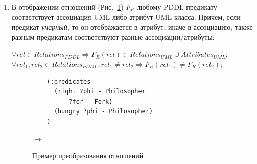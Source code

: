 \documentclass[a4paper,14pt]{extreport}
\begin{document}
\begin{enumerate}
        \item В отображении отношений (Рис.~\ref{img:property-relations}) $F_R$ любому PDDL-предикату соответствует ассоциация UML либо атрибут UML-класса. Причем, если предикат \textit{унарный}, то он отображается в атрибут, иначе в ассоциацию; также разным предикатам соответствуют разные ассоциации/атрибуты:
    
        \begin{center}
        $\forall rel \in Relations_{PDDL} \Rightarrow F_R(rel) \in Relations_{UML} \cup Attributes_{UML}$;\\
        $\forall rel_1, rel_2 \in Relations_{PDDL}, rel_1 \neq rel_2 \Rightarrow F_R(rel_1) \neq F_R(rel_2)$; \\
        \end{center}

    
\begin{figure}[h]
    \hfill
    \begin{minipage}[h]{0.50\linewidth}
        {\raggedright
        \begin{verbatim}
    (:predicates
      (right ?phi - Philosopher 
          ?for - Fork)
      (hungry ?phi - Philosopher)
    )
        \end{verbatim} 
        }
    \end{minipage}
    \hfill
    $\rightarrow$
    \hfill
    \begin{minipage}[h]{0.45\linewidth}
    \end{minipage}
    \caption{Пример преобразования отношений}
    \label{img:property-relations}
\end{figure}       



\end{enumerate}
\end{document}
